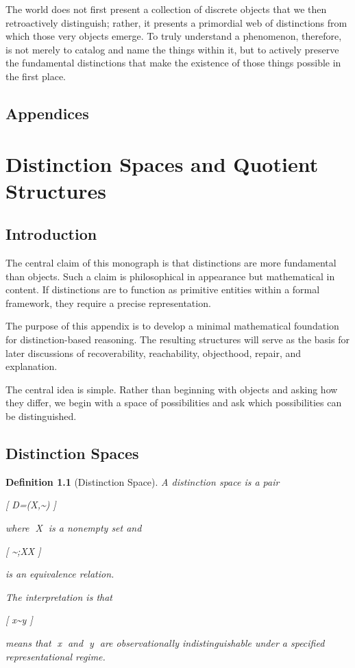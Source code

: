\documentclass[11pt,oneside,openany]{book}
\newtheorem{definition}{Definition}[chapter] \newtheorem{theorem}{Theorem}[chapter] \newtheorem{proposition}{Proposition}[chapter] \newtheorem{lemma}{Lemma}[chapter] \newtheorem{corollary}{Corollary}[chapter] \newtheorem{remark}{Remark}[chapter]
\begin{document}
The world does not first present a collection of discrete objects that we then retroactively distinguish; rather, it presents a primordial web of distinctions from which those very objects emerge. To truly understand a phenomenon, therefore, is not merely to catalog and name the things within it, but to actively preserve the fundamental distinctions that make the existence of those things possible in the first place.


\newpage 
\section*{Appendices}

\appendix

\chapter{Distinction Spaces and Quotient Structures}

\section{Introduction}

The central claim of this monograph is that distinctions are more fundamental than objects. Such a claim is philosophical in appearance but mathematical in content. If distinctions are to function as primitive entities within a formal framework, they require a precise representation.

The purpose of this appendix is to develop a minimal mathematical foundation for distinction-based reasoning. The resulting structures will serve as the basis for later discussions of recoverability, reachability, objecthood, repair, and explanation.

The central idea is simple. Rather than beginning with objects and asking how they differ, we begin with a space of possibilities and ask which possibilities can be distinguished.

\section{Distinction Spaces}

\begin{definition}[Distinction Space]

A distinction space is a pair

[
\mathcal D=(X,\sim)
]

where X is a nonempty set and

[
\sim ;\subseteq X\times X
]

is an equivalence relation.

The interpretation is that

[
x\sim y
]

means that x and y are observationally indistinguishable under a specified representational regime.

\end{definition}
\end{document}

